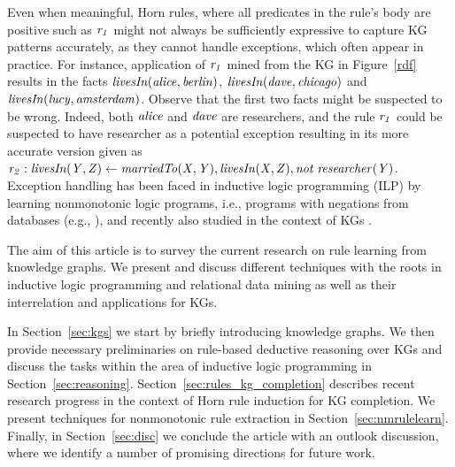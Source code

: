 Even when meaningful, Horn rules, where all predicates in the rule's body are positive such as $\mathit{r_1}$ might not always be sufficiently expressive to capture KG patterns accurately, as they cannot handle exceptions, which often appear in practice. 
For instance, application of $\mathit{r_1}$ mined from the KG in Figure~\ref{rdf} results in the facts $\mathit{livesIn(alice,berlin)}$, $\mathit{livesIn(dave,chicago)}$ and $\mathit{livesIn(lucy,amsterdam)}$. Observe that the first two facts might be suspected to be wrong. Indeed, both $\mathit{alice}$ and $\mathit{dave}$ are researchers, and the rule $\mathit{r_1}$ could be suspected to have researcher as a potential exception resulting in its more accurate version given as $\mathit{r_2:\;}\mathit{livesIn(Y,Z)}\leftarrow \mathit{marriedTo(X,Y),livesIn(X,Z), not\;researcher(Y)}$.
Exception handling has been faced in inductive logic programming (ILP) by learning nonmonotonic logic programs, i.e., programs with negations from databases (e.g., \cite{DBLP:conf/ijcai/InoueK97,DBLP:journals/tocl/Sakama05,XHAIL}), and recently also studied in the context of KGs \cite{gad2016,rumis}.


The aim of this article is to survey the current research on rule learning from knowledge graphs. We present and discuss different techniques with the roots in inductive logic programming and relational data mining as well as their interrelation and applications for KGs. 

In Section~\ref{sec:kgs} we start by briefly introducing knowledge graphs. We then provide necessary preliminaries on rule-based deductive reasoning over KGs and discuss the tasks within the area of inductive logic programming in Section~\ref{sec:reasoning}. Section~\ref{sec:rules_kg_completion} %
describes recent research progress in the context of Horn rule induction for KG completion. We present techniques for nonmonotonic rule extraction in Section~\ref{sec:nmrulelearn}. Finally, in Section~\ref{sec:disc} we conclude the article with an outlook discussion, where we identify a number of promising directions for future work.

